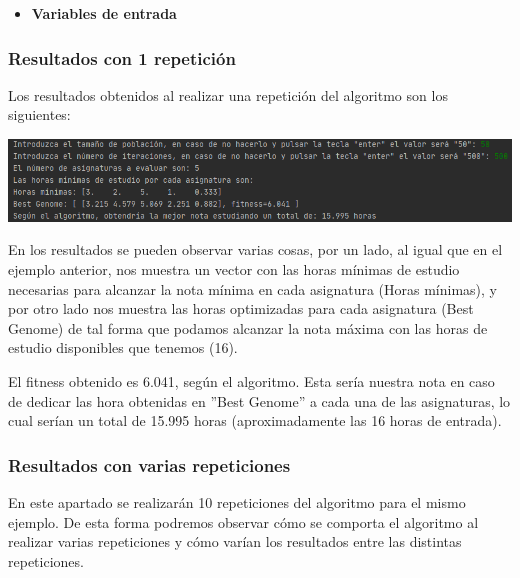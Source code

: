 \documentclass[11pt, a4paper, titlepage]{article}
\begin{document}
\vspace{5mm}

\begin{itemize}
\item \textbf{Variables de entrada}
\end{itemize}


\newpage

\subsubsection{Resultados con 1 repetición}
Los resultados obtenidos al realizar una repetición del algoritmo son los siguientes:

\vspace{5mm}

\includegraphics[scale=0.7]{img/Res1_horas_sufi.png}

\vspace{5mm}

En los resultados se pueden observar varias cosas, por un lado, al igual que en el ejemplo anterior, nos muestra un vector con las horas mínimas de estudio necesarias para alcanzar la nota mínima en cada asignatura (Horas mínimas), y por otro lado nos muestra las horas optimizadas para cada asignatura (Best Genome) de tal forma que podamos alcanzar la nota máxima con las horas de estudio disponibles que tenemos (16).

\vspace{5mm}

El fitness obtenido es 6.041, según el algoritmo. Esta sería nuestra nota en caso de dedicar las hora obtenidas en ''Best Genome'' a cada una de las asignaturas, lo cual serían un total de 15.995 horas (aproximadamente las 16 horas de entrada).



\subsubsection{Resultados con varias repeticiones}
En este apartado se realizarán 10 repeticiones del algoritmo para el mismo ejemplo. De esta forma podremos observar cómo se comporta el algoritmo al realizar varias repeticiones y cómo varían los resultados entre las distintas repeticiones.
\end{document}
